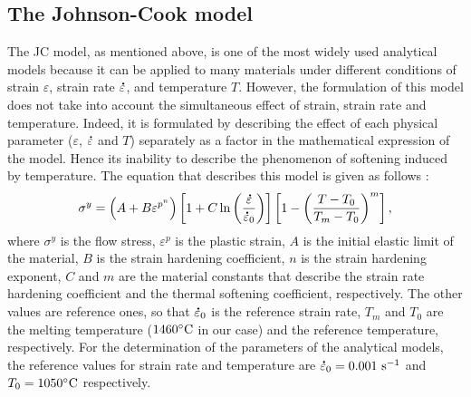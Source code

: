 \documentclass[twoside,english,1p,final,sort&compress]{elsarticle}
\theoremstyle{plain}
\DeclareRobustCommand{\mdot}[1]{\accentset{\mbox{\bfseries .}}{#1}}
\DeclareRobustCommand{\ps}{\text{s}^{-1}}
\begin{document}
\subsection{The Johnson-Cook model\label{sec:JC}}

The JC model, as mentioned above, is one of the most widely used analytical models because it can be applied to many materials under different conditions of strain $\varepsilon$, strain rate $\mdot\varepsilon$, and temperature $T$.
However, the formulation of this model does not take into account the simultaneous effect of strain, strain rate and temperature.
Indeed, it is formulated by describing the effect of each physical parameter ($\varepsilon$, $\mdot\varepsilon$ and $T$) separately as a factor in the mathematical expression of the model.
Hence its inability to describe the phenomenon of softening induced by temperature.
The equation that describes this model is given as follows \cite{Johnson-1983}:
\begin{equation}
\sigma^y=\left(A+B\varepsilon^{p^{n}}\right) \left[1+C\ln\left(\frac{\mdot\varepsilon}{\mdot\varepsilon_0}\right)\right] \left[1-\left(\frac{T-T_0}{T_m-T_0}\right)^{m}\right],\label{eq:Johnson-Cook}
\end{equation}
where $\sigma^y$ is the flow stress, $\varepsilon^p$ is the plastic strain, $A$ is the initial elastic limit of the material, $B$ is the strain hardening coefficient, $n$ is the strain hardening exponent, $C$ and $m$ are the material constants that describe the strain rate hardening coefficient and the thermal softening coefficient, respectively.
The other values are reference ones, so that $\mdot\varepsilon_0$ is the reference strain rate, $T_m$ and $T_0$ are the melting temperature ($1460\celsius$ in our case) and the reference temperature, respectively.
For the determination of the parameters of the analytical models, the reference values for strain rate and temperature are $\mdot\varepsilon_0=0.001~\ps$ and $T_0=1050\celsius$ respectively.
\end{document}
